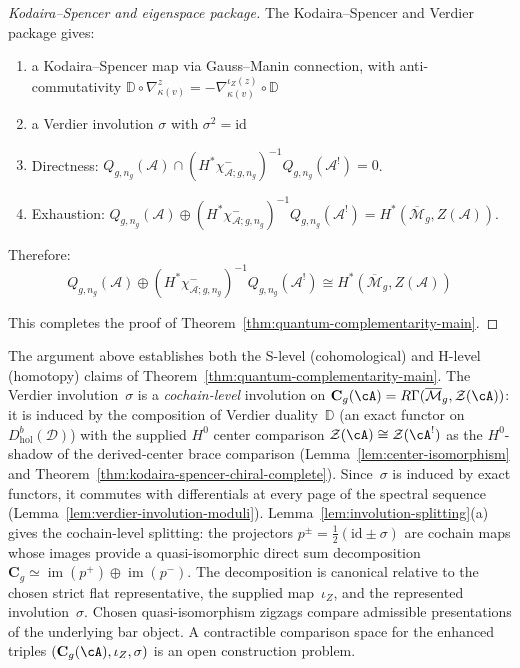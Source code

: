 \begin{proof}[Kodaira--Spencer and eigenspace package]
The Kodaira--Spencer and Verdier package gives:
\begin{enumerate}
\item a Kodaira--Spencer map via Gauss--Manin connection, with anti-commutativity
$\mathbb{D} \circ \nabla_{\kappa(v)}^z =
-\nabla_{\kappa(v)}^{\iota_Z(z)} \circ \mathbb{D}$
\item a Verdier involution $\sigma$ with $\sigma^2 = \mathrm{id}$
\item Directness:
$Q_{g,n_g}(\mathcal{A})\cap
(H^*\chi^-_{\mathcal A;g,n_g})^{-1}Q_{g,n_g}(\mathcal{A}^!)=0$.
\item Exhaustion:
$Q_{g,n_g}(\mathcal{A})\oplus
(H^*\chi^-_{\mathcal A;g,n_g})^{-1}Q_{g,n_g}(\mathcal{A}^!)
=H^*(\overline{\mathcal{M}}_g,Z(\mathcal{A}))$.
\end{enumerate}

Therefore:
\begin{equation}
Q_{g,n_g}(\mathcal{A})\oplus
(H^*\chi^-_{\mathcal A;g,n_g})^{-1}Q_{g,n_g}(\mathcal{A}^!)
\cong H^*(\overline{\mathcal{M}}_g,Z(\mathcal{A}))
\end{equation}

This completes the proof of Theorem~\ref{thm:quantum-complementarity-main}. \qedhere

\end{proof}

\begin{remark}
\label{rem:h-level-proof-summary}
The argument above establishes both the
S-level (cohomological) and H-level (homotopy) claims of
Theorem~\ref{thm:quantum-complementarity-main}. The Verdier
involution~$\sigma$ is a
\emph{cochain-level} involution on
$\mathbf{C}_g(\cA) = R\Gamma(\overline{\mathcal{M}}_g, \mathcal{Z}(\cA))$:
it is induced by the composition of Verdier duality~$\mathbb{D}$
(an exact functor on $D^b_{\mathrm{hol}}(\mathcal{D})$) with the
supplied $H^0$ center comparison
$\mathcal{Z}(\cA) \cong \mathcal{Z}(\cA^!)$
as the \(H^0\)-shadow of the derived-center brace comparison
(Lemma~\ref{lem:center-isomorphism} and
Theorem~\ref{thm:kodaira-spencer-chiral-complete}).
Since~$\sigma$ is induced by exact functors, it commutes with
differentials at every page of the spectral sequence
(Lemma~\ref{lem:verdier-involution-moduli}).
Lemma~\ref{lem:involution-splitting}(a) gives
the cochain-level splitting: the projectors
$p^\pm = \tfrac{1}{2}(\mathrm{id} \pm \sigma)$ are cochain maps
whose images provide a quasi-isomorphic direct sum decomposition
$\mathbf{C}_g \simeq \operatorname{im}(p^+) \oplus \operatorname{im}(p^-)$.
The decomposition is canonical relative to the chosen strict flat
representative, the supplied map~$\iota_Z$, and the represented
involution~$\sigma$.  Chosen quasi-isomorphism zigzags compare
admissible presentations of the underlying bar object.  A contractible
comparison space for the enhanced triples
$(\mathbf C_g(\cA),\iota_Z,\sigma)$ is an open construction problem.
\end{remark}

